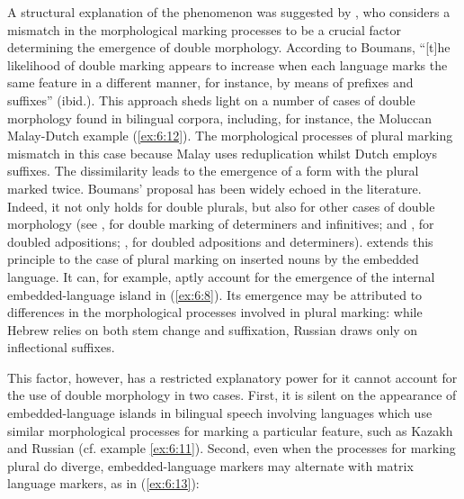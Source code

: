 A structural explanation of the phenomenon was suggested by \citet[][91]{boumans-syntax-1998}, who considers a mismatch in the morphological marking processes to be a crucial factor determining the emergence of double morphology. According to Boumans, ``[t]he likelihood of double marking appears to increase when each language marks the same feature in a different manner, for instance, by means of prefixes and suffixes'' (ibid.). This approach sheds light on a number of cases of double morphology found in bilingual corpora, including, for instance, the Moluccan Malay-Dutch example (\ref{ex:6:12}). The morphological processes of plural marking mismatch in this case because Malay uses reduplication whilst Dutch employs suffixes. The dissimilarity leads to the emergence of a form with the plural marked twice. Boumans' proposal has been widely echoed in the literature. Indeed, it not only holds for double plurals, but also for other cases of double morphology (see \citealt[91]{myers-scotton-contact-2002}, for double marking of determiners and infinitives; \citealt[104]{muysken-bilingual-2000} and \citealt[152--156]{muhamedowa-untersuchung-2006}, for doubled adpositions; \citealt[346--352]{szabo-language-2010}, for doubled adpositions and determiners). \citet[150]{myers-scotton-contact-2002} extends this principle to the case of plural marking on inserted nouns by the embedded language. It can, for example, aptly account for the emergence of the internal embedded-language island in (\ref{ex:6:8}). Its emergence may be attributed to differences in the morphological processes involved in plural marking: while Hebrew relies on both stem change and suffixation, Russian draws only on inflectional suffixes.

This factor, however, has a restricted explanatory power for it cannot account for the use of double morphology in two cases. First, it is silent on the appearance of embedded-language islands in bilingual speech involving languages which use similar morphological processes for marking a particular feature, such as Kazakh and Russian (cf. example \ref{ex:6:11}). Second, even when the processes for marking plural do diverge, embedded-language markers may alternate with matrix language markers, as in (\ref{ex:6:13}):

